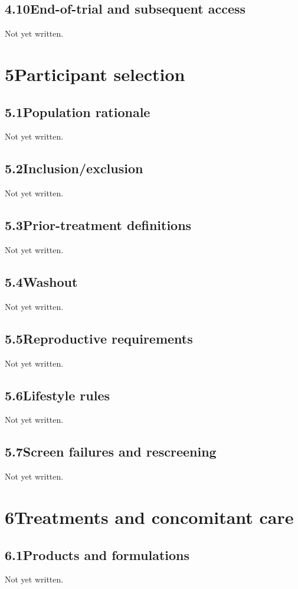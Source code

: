\documentclass[11pt,a4paper]{article}
\newcommand{\psnote}[2]{\par\noindent\colorbox{#1!8}{\parbox{\dimexpr\linewidth-2\fboxsep}{\small\color{#1}#2}}\par}
\begin{document}
\subsection{4.10\quad End-of-trial and subsequent access}\label{section.4.10}
\psnote{pswarn}{Not yet written.}
\section{5\quad Participant selection}\label{section.5}
\subsection{5.1\quad Population rationale}\label{section.5.1}
\psnote{pswarn}{Not yet written.}
\subsection{5.2\quad Inclusion/exclusion}\label{section.5.2}
\psnote{pswarn}{Not yet written.}
\subsection{5.3\quad Prior-treatment definitions}\label{section.5.3}
\psnote{pswarn}{Not yet written.}
\subsection{5.4\quad Washout}\label{section.5.4}
\psnote{pswarn}{Not yet written.}
\subsection{5.5\quad Reproductive requirements}\label{section.5.5}
\psnote{pswarn}{Not yet written.}
\subsection{5.6\quad Lifestyle rules}\label{section.5.6}
\psnote{pswarn}{Not yet written.}
\subsection{5.7\quad Screen failures and rescreening}\label{section.5.7}
\psnote{pswarn}{Not yet written.}
\section{6\quad Treatments and concomitant care}\label{section.6}
\subsection{6.1\quad Products and formulations}\label{section.6.1}
\psnote{pswarn}{Not yet written.}
\end{document}
